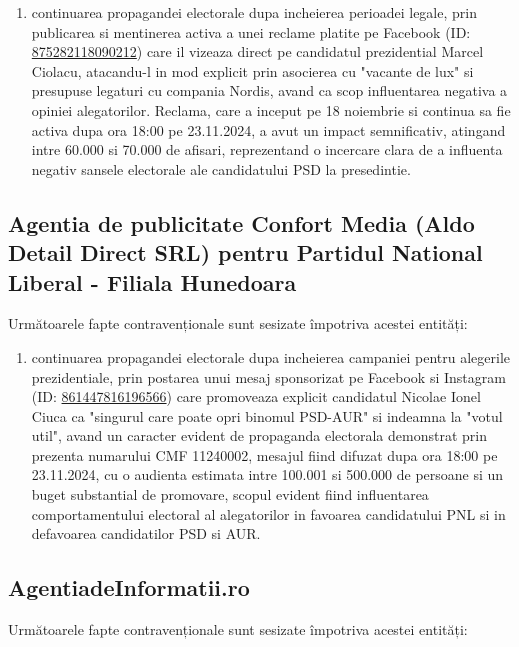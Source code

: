 \documentclass[a4paper,12pt]{article}
\begin{document}
\begin{enumerate}[leftmargin=*, label=\arabic*.)]
    \item continuarea propagandei electorale dupa incheierea perioadei legale, prin publicarea si mentinerea activa a unei reclame platite pe Facebook (ID: \href{https://www.facebook.com/ads/library/?id=875282118090212}{875282118090212}) care il vizeaza direct pe candidatul prezidential Marcel Ciolacu, atacandu-l in mod explicit prin asocierea cu "vacante de lux" si presupuse legaturi cu compania Nordis, avand ca scop influentarea negativa a opiniei alegatorilor. Reclama, care a inceput pe 18 noiembrie si continua sa fie activa dupa ora 18:00 pe 23.11.2024, a avut un impact semnificativ, atingand intre 60.000 si 70.000 de afisari, reprezentand o incercare clara de a influenta negativ sansele electorale ale candidatului PSD la presedintie.
\end{enumerate}

\vspace{0.5cm}

\subsection{Agentia de publicitate Confort Media (Aldo Detail Direct SRL) pentru Partidul National Liberal - Filiala Hunedoara}
Următoarele fapte contravenționale sunt sesizate împotriva acestei entități:

\begin{enumerate}[leftmargin=*, label=\arabic*.)]
    \item continuarea propagandei electorale dupa incheierea campaniei pentru alegerile prezidentiale, prin postarea unui mesaj sponsorizat pe Facebook si Instagram (ID: \href{https://www.facebook.com/ads/library/?id=861447816196566}{861447816196566}) care promoveaza explicit candidatul Nicolae Ionel Ciuca ca "singurul care poate opri binomul PSD-AUR" si indeamna la "votul util", avand un caracter evident de propaganda electorala demonstrat prin prezenta numarului CMF 11240002, mesajul fiind difuzat dupa ora 18:00 pe 23.11.2024, cu o audienta estimata intre 100.001 si 500.000 de persoane si un buget substantial de promovare, scopul evident fiind influentarea comportamentului electoral al alegatorilor in favoarea candidatului PNL si in defavoarea candidatilor PSD si AUR.
\end{enumerate}

\vspace{0.5cm}

\subsection{AgentiadeInformatii.ro}
Următoarele fapte contravenționale sunt sesizate împotriva acestei entități:
\end{document}
